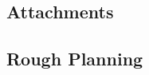 \begin{landscape}
\chapter{Attachments}
\section{Rough Planning}
\thispagestyle{empty}

\begin{center}
\end{center}
\end{landscape}